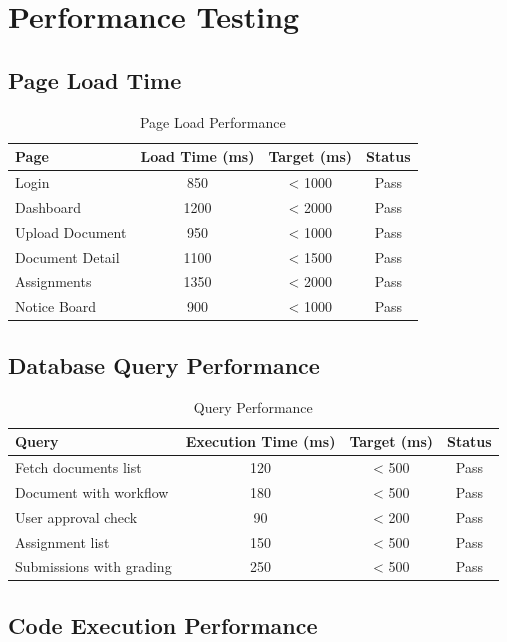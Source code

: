 \section{Performance Testing}

\subsection{Page Load Time}

\begin{table}[H]
\centering
\begin{tabular}{|l|c|c|c|}
\hline
\textbf{Page} & \textbf{Load Time (ms)} & \textbf{Target (ms)} & \textbf{Status} \\
\hline
Login & 850 & < 1000 & Pass \\
Dashboard & 1200 & < 2000 & Pass \\
Upload Document & 950 & < 1000 & Pass \\
Document Detail & 1100 & < 1500 & Pass \\
Assignments & 1350 & < 2000 & Pass \\
Notice Board & 900 & < 1000 & Pass \\
\hline
\end{tabular}
\caption{Page Load Performance}
\end{table}

\subsection{Database Query Performance}

\begin{table}[H]
\centering
\begin{tabular}{|l|c|c|c|}
\hline
\textbf{Query} & \textbf{Execution Time (ms)} & \textbf{Target (ms)} & \textbf{Status} \\
\hline
Fetch documents list & 120 & < 500 & Pass \\
Document with workflow & 180 & < 500 & Pass \\
User approval check & 90 & < 200 & Pass \\
Assignment list & 150 & < 500 & Pass \\
Submissions with grading & 250 & < 500 & Pass \\
\hline
\end{tabular}
\caption{Query Performance}
\end{table}

\subsection{Code Execution Performance}

